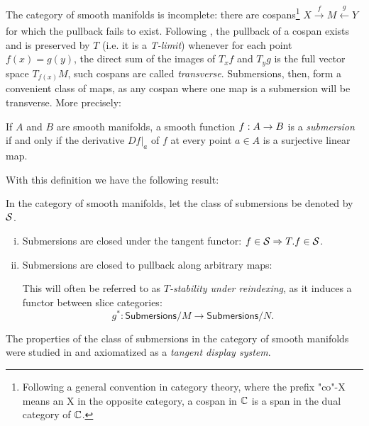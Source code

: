 The category of smooth manifolds is incomplete: there are cospans\footnote{Following a general convention in category theory, where the prefix "co"-X means an X in the opposite category, a cospan in $\mathbb{C}$ is a span in the dual category of $\mathbb{C}$.} $X \xrightarrow[]{f} M \xleftarrow[]{g} Y$ for which the pullback fails to exist. Following \cite{thom1954}, the pullback of a cospan exists and is preserved by $T$ (i.e. it is a \emph{T-limit}) whenever for each point $f(x) = g(y)$, the direct sum of the images of $T_xf$ and $T_yg$ is the full vector space $T_{f(x)}M$, such cospans are called \emph{transverse}. Submersions, then, form a convenient class of maps, as any cospan where one map is a submersion will be transverse. More precisely:
\begin{definition}
    \label{def:submersion-sman}
    If $A$ and $B$ are smooth manifolds, a smooth function $f:\linebreak A \rightarrow B$ is a \emph{submersion} if and only if the derivative $Df|_a$ of $f$ at every point $a\in A$ is a surjective linear map.
\end{definition}
With this definition we have the following result:
\begin{proposition}%
    \label{prop:submersion-properties}
    In the category of smooth manifolds, let the class of submersions be denoted by $\mathcal{S}$.
    \begin{enumerate}[(i)]
        \item Submersions are closed under the tangent functor: $f \in \mathcal{S} \Rightarrow T.f \in \mathcal{S}$.
        \item Submersions are closed to pullback along arbitrary maps:
         
        This will often be referred to as \emph{$T$-stability under reindexing}, as it induces a functor between slice categories: 
        \[g^*: \mathsf{Submersions}/M \to \mathsf{Submersions}/N.\]
    \end{enumerate}
\end{proposition}
The properties of the class of submersions in the category of smooth manifolds were studied in \cite{Cockett2018} and axiomatized as a \emph{tangent display system}.

